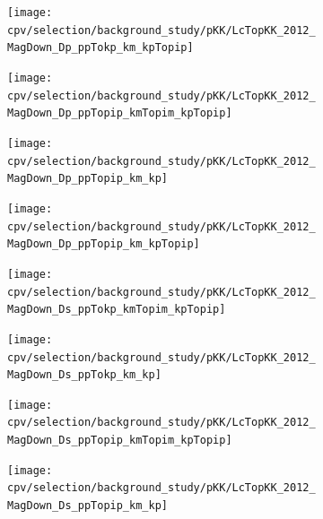 \begin{figure}
  \begin{subfigure}[b]{0.3\textwidth}
    \texttt{[image: cpv/selection/background\_study/pKK/LcTopKK\_2012\_MagDown\_Dp\_ppTokp\_km\_kpTopip]}
    \caption{\decay{\PDplus}{\PKplus\PKminus\Ppiplus}}
    \label{fig:cpv:selection:background_study:pKK_meson:dplus_kkpi}
  \end{subfigure}
  \begin{subfigure}[b]{0.3\textwidth}
    \texttt{[image: cpv/selection/background\_study/pKK/LcTopKK\_2012\_MagDown\_Dp\_ppTopip\_kmTopim\_kpTopip]}
    \caption{\decay{\PDplus}{\Ppiplus\Ppiminus\Ppiplus}}
    \label{fig:cpv:selection:background_study:pKK_meson:dplus_pipipi}
  \end{subfigure}
  \begin{subfigure}[b]{0.3\textwidth}
    \texttt{[image: cpv/selection/background\_study/pKK/LcTopKK\_2012\_MagDown\_Dp\_ppTopip\_km\_kp]}
    \caption{\decay{\PDplus}{\Ppiplus\PKminus\PKplus}}
    \label{fig:cpv:selection:background_study:pKK_meson:dplus_pikk}
  \end{subfigure}

  \begin{subfigure}[b]{0.3\textwidth}
    \texttt{[image: cpv/selection/background\_study/pKK/LcTopKK\_2012\_MagDown\_Dp\_ppTopip\_km\_kpTopip]}
    \caption{\decay{\PDplus}{\Ppiplus\PKminus\Ppiplus}}
    \label{fig:cpv:selection:background_study:pKK_meson:dplus_pikpi}
  \end{subfigure}
  \begin{subfigure}[b]{0.3\textwidth}
    \texttt{[image: cpv/selection/background\_study/pKK/LcTopKK\_2012\_MagDown\_Ds\_ppTokp\_kmTopim\_kpTopip]}
    \caption{\decay{\PDsplus}{\PKplus\Ppiminus\Ppiplus}}
    \label{fig:cpv:selection:background_study:pKK_meson:dsplus_Kpipi}
  \end{subfigure}
  \begin{subfigure}[b]{0.3\textwidth}
    \texttt{[image: cpv/selection/background\_study/pKK/LcTopKK\_2012\_MagDown\_Ds\_ppTokp\_km\_kp]}
    \caption{\decay{\PDsplus}{\PKplus\PKminus\PKplus}}
    \label{fig:cpv:selection:background_study:pKK_meson:dsplus_KKK}
  \end{subfigure}

  \begin{subfigure}[b]{0.3\textwidth}
    \texttt{[image: cpv/selection/background\_study/pKK/LcTopKK\_2012\_MagDown\_Ds\_ppTopip\_kmTopim\_kpTopip]}
    \caption{\decay{\PDsplus}{\Ppiplus\Ppiminus\Ppiplus}}
    \label{fig:cpv:selection:background_study:pKK_meson:dsplus_pipipi}
  \end{subfigure}
  \begin{subfigure}[b]{0.3\textwidth}
    \texttt{[image: cpv/selection/background\_study/pKK/LcTopKK\_2012\_MagDown\_Ds\_ppTopip\_km\_kp]}
    \caption{\decay{\PDsplus}{\Ppiplus\PKminus\PKplus}}
    \label{fig:cpv:selection:background_study:pKK_meson:dsplus_piKK}
  \end{subfigure}


\end{figure}
